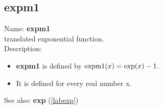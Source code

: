 \subsection{expm1}
\label{labexpm1}
\noindent Name: \textbf{expm1}\\
translated exponential function.\\
\noindent Description: \begin{itemize}

\item \textbf{expm1} is defined by ${\rm expm1}(x) = \exp(x)-1$.

\item It is defined for every real number x.
\end{itemize}
See also: \textbf{exp} (\ref{labexp})
